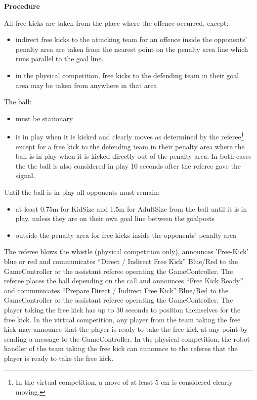 \bigskip

{\bfseries Procedure}

\headlinebox

All free kicks are taken from the place where the offence occurred, except:
\begin{itemize}
\item indirect free kicks to the attacking team for an offence inside the
  opponents' penalty area are taken from the nearest point
  on the penalty area line which runs parallel to the goal
  line.
\item in the physical competition, free kicks to the defending team in their goal area may be taken from anywhere in that area

\end{itemize}

The ball:
\begin{itemize}
\item must be stationary 
\item is in play when it is kicked and clearly moves as determined by the
      referee\footnote{In the virtual competition, a move of at least 5 cm is considered clearly moving.} except for a free kick to the defending team in their penalty area
      where the ball is in play when it is kicked directly out of the penalty area.
      In both cases the the ball is also considered in play 10 seconds
      after the referee gave the signal.
\end{itemize}

Until the ball is in play all opponents must remain:
\begin{itemize}
\item at least 0.75m for KidSize and 1.5m for AdultSize
       from the ball until it is in play,
      unless they are on their own goal line between the goalposts 
\item outside the penalty area for free kicks inside the opponents' penalty area
\end{itemize}

The referee blows the whistle (physical competition only), announces 'Free-Kick' blue or
red and communicates ``Direct / Indirect Free Kick'' Blue/Red to the
  GameController or the assistant referee operating the GameController.
The referee places the ball depending on the call and announces
``Free Kick Ready'' and communicates
``Prepare Direct / Indirect Free Kick'' Blue/Red to the GameController or the assistant referee operating the GameController.
The player taking the free kick has up to 30 seconds to position themselves for
the free kick.
In the virtual competition, any player from the team taking the free kick may announce that the
player is ready to take the free kick at any point by sending a
message to the GameController. In the physical competition, the robot handler of the team taking the free kick can announce to the referee that the player is ready to take the free kick.

